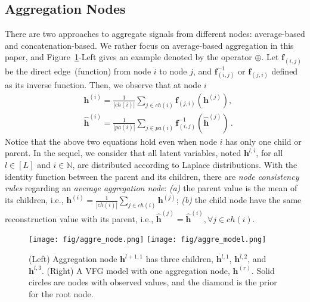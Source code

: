 \documentclass[sigconf, anonymous, review]{acmart}
\theoremstyle{plain}
\theoremstyle{definition}
\theoremstyle{remark}
\begin{document}
\subsection{ Aggregation Nodes}\label{sec:node_aggr}
 There are two approaches to aggregate signals from different nodes: average-based and concatenation-based. We rather focus on average-based aggregation in this paper,  and Figure~\ref{fig:node_aggre}-Left gives  an example denoted by the operator $\oplus$. 
Let $\mathbf{f}_{(i, j)}$ be the direct edge~(function) from node $i$ to node $j$, and $\mathbf{f}^{-1}_{ (i, j)}$ or  $\mathbf{f}_{ (j, i)}$ defined as its inverse function. Then, we observe that at node $i$
 \begin{align*}
&  \mathbf{h}^{(i)} = \frac{1}{|ch(i)|} \sum_{j \in ch(i) } \mathbf{f}_{(j,i)}(\mathbf{h}^{(j)})  , \\ &\widehat{\mathbf{h}}^{(i)} = \frac{1}{|pa(i)|} \sum_{j \in pa(i) } \mathbf{f}^{-1}_{ (i,j)}(\widehat{\mathbf{h}}^{(j)}) \, .
\end{align*}
Notice that the above two equations hold even when node $i$ has only one child or parent.
In the sequel, we consider that all latent variables, noted $\mathbf{h}^{l, i}$, for all $l \in [L]$ and $i \in \mathbb{N}$, are distributed according to Laplace distributions. 
With the identity function between the  parent and its children, there are \emph{node consistency rules} regarding an \emph{average aggregation node}: {\it(a)} the parent value is the mean of its children, i.e., $\mathbf{h}^{(i)} = \frac{1}{|ch(i)|} \sum_{j \in ch(i)} \mathbf{h}^{(j)}$; {\it(b)} the  child node have the same reconstruction value with its parent, i.e., $\widehat{\mathbf{h}}^{(j)} = \widehat{\mathbf{h}}^{(i)}, \forall j \in ch(i)$. 
\begin{figure}[h]
\vspace{-0.1in}
\begin{center}
 \texttt{[image: fig/aggre\_node.png]}
  \texttt{[image: fig/aggre\_model.png]}
\end{center}
\vspace{-0.15in}
   \caption{(Left) Aggregation node $\mathbf{h}^{l+1,1}$ has three children, $\mathbf{h}^{l,1}$, $\mathbf{h}^{l,2}$, and $\mathbf{h}^{l,3}$. (Right) A VFG model with one aggregation node, $\mathbf{h}^{(r)}$. Solid circles are nodes with observed values, and the diamond is the prior for the root node.}
\label{fig:node_aggre}
\end{figure}
\vspace{-0.15in}
\end{document}
